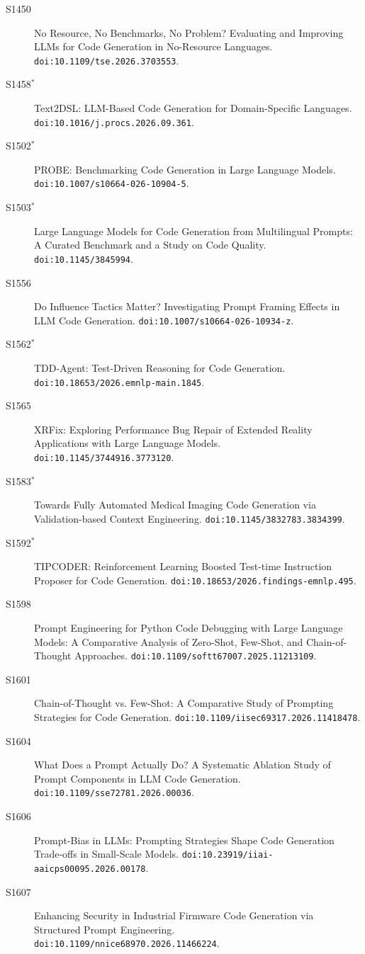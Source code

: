 {\begin{description}
\item[S1450] No Resource, No Benchmarks, No Problem? Evaluating and Improving LLMs for Code Generation in No-Resource Languages. \texttt{doi:10.1109/tse.2026.3703553}.
\item[S1458$^\ast$] Text2DSL: LLM-Based Code Generation for Domain-Specific Languages. \texttt{doi:10.1016/j.procs.2026.09.361}.
\item[S1502$^\ast$] PROBE: Benchmarking Code Generation in Large Language Models. \texttt{doi:10.1007/s10664-026-10904-5}.
\item[S1503$^\ast$] Large Language Models for Code Generation from Multilingual Prompts: A Curated Benchmark and a Study on Code Quality. \texttt{doi:10.1145/3845994}.
\item[S1556] Do Influence Tactics Matter? Investigating Prompt Framing Effects in LLM Code Generation. \texttt{doi:10.1007/s10664-026-10934-z}.
\item[S1562$^\ast$] TDD-Agent: Test-Driven Reasoning for Code Generation. \texttt{doi:10.18653/2026.emnlp-main.1845}.
\item[S1565] XRFix: Exploring Performance Bug Repair of Extended Reality Applications with Large Language Models. \texttt{doi:10.1145/3744916.3773120}.
\item[S1583$^\ast$] Towards Fully Automated Medical Imaging Code Generation via Validation-based Context Engineering. \texttt{doi:10.1145/3832783.3834399}.
\item[S1592$^\ast$] TIPCODER: Reinforcement Learning Boosted Test-time Instruction Proposer for Code Generation. \texttt{doi:10.18653/2026.findings-emnlp.495}.
\item[S1598] Prompt Engineering for Python Code Debugging with Large Language Models: A Comparative Analysis of Zero-Shot, Few-Shot, and Chain-of-Thought Approaches. \texttt{doi:10.1109/softt67007.2025.11213109}.
\item[S1601] Chain-of-Thought vs. Few-Shot: A Comparative Study of Prompting Strategies for Code Generation. \texttt{doi:10.1109/iisec69317.2026.11418478}.
\item[S1604] What Does a Prompt Actually Do? A Systematic Ablation Study of Prompt Components in LLM Code Generation. \texttt{doi:10.1109/sse72781.2026.00036}.
\item[S1606] Prompt-Bias in LLMs: Prompting Strategies Shape Code Generation Trade-offs in Small-Scale Models. \texttt{doi:10.23919/iiai-aaicps00095.2026.00178}.
\item[S1607] Enhancing Security in Industrial Firmware Code Generation via Structured Prompt Engineering. \texttt{doi:10.1109/nnice68970.2026.11466224}.

\end{description}}
